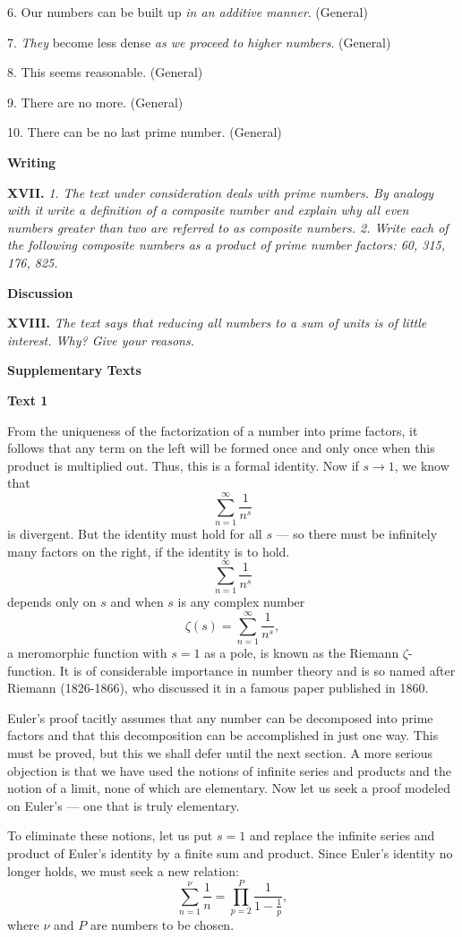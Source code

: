 \documentclass[a4paper]{article}
\newcommand{\ESect}[1]{\medskip\par{\large \textbf{#1}}\par}
\newcommand{\ETask}[2]{\medskip\par\textbf{#1.} \textit{#2}\par}
\begin{document}
6. Our numbers can be built up \textit{in an additive manner}. (General)

7. \textit{They} become less dense \textit{as we proceed to higher numbers}. (General)

8. This seems reasonable. (General)

9. There are no more. (General)

10. There can be no last prime number. (General)

\ESect{Writing}

\ETask{XVII}{1. The text under consideration deals with prime numbers. By analogy with it write a definition of a composite
number and explain why all even numbers greater than two are referred to as composite numbers. 2. Write each of the following
composite numbers as a product of prime number factors: 60, 315, 176, 825.}

\ESect{Discussion}
\ETask{XVIII}{The text says that reducing all numbers to a sum of units is of little interest. Why? Give your reasons.}

\ESect{Supplementary Texts}

\ESect{Text 1}
From the uniqueness of the factorization of a number into prime factors, it follows that any term on the left will be formed once
and only once when this product is multiplied out. Thus, this is a formal identity. Now if $s \rightarrow 1$, we know that
$$\sum_{n=1}^\infty \frac{1}{n^s}$$ is divergent. But the identity must hold for all $s$ --- so there must be infinitely many factors
on the right, if the identity is to hold.
$$\sum_{n=1}^\infty \frac{1}{n^s}$$ depends only on $s$ and when $s$ is any complex number
$$\zeta(s)=\sum_{n=1}^\infty \frac{1}{n^s},$$
a meromorphic function with $s = 1$ as a pole, is known as the Riemann $\zeta$-function. It is of considerable importance in number
theory and is so named after Riemann (1826-1866), who discussed it in a famous paper published in 1860.

Euler's proof tacitly assumes that any number can be decomposed into prime factors and that this decomposition can be accomplished
in just one way. This must be proved, but this we shall defer until the next section. A more serious objection is that we have used
the notions of infinite series and products and the notion of a limit, none of which are elementary. Now let us seek a proof
modeled on Euler's --- one that is truly elementary.

To eliminate these notions, let us put $s = 1$ and replace the infinite series and product of Euler's identity by a finite
sum and product. Since Euler's identity no longer holds, we must seek a new relation:
$$ \sum_{n=1}^{\nu}\frac{1}{n}= \prod_{p=2}^P\frac{1}{1-\frac{1}{p}},$$
where $\nu$ and $P$ are numbers to be chosen.
\end{document}
